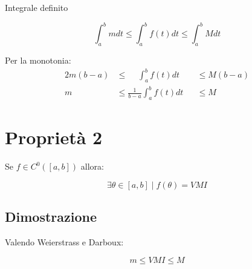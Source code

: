 \documentclass[../dimostrazioni]{subfiles}
\begin{document}
            Integrale definito

            \[\int_{a}^{b} m dt \leqslant \int_{a}^{b} f(t) dt \leqslant \int_{a}^{b} M dt\]

            Per la monotonia:
            \begin{alignat*}{2}
                m(b-a) &\leqslant \quad \: \int_{a}^{b} f(t) dt &&\leqslant M(b-a) \\
                m &\leqslant \frac{1}{b-a} \int_{a}^{b} f(t) dt &&\leqslant M
            \end{alignat*}

    \section*{Proprietà 2}

        Se \(f \in C^0 ([a,b]) \) allora:


        \[\exists \theta\in [a, b] \mid f(\theta) = VMI \]

        \subsection*{Dimostrazione}
    
            Valendo Weierstrass e Darboux:

            \[m \leqslant VMI \leqslant M \]
        
\end{document}
